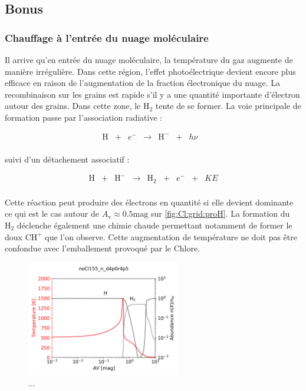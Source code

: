 
\subsection{Bonus}
\subsubsection{Chauffage à l'entrée du nuage moléculaire}

Il arrive qu'en entrée du nuage moléculaire, la température du gaz augmente de manière irrégulière. Dans cette région, l'effet photoélectrique devient encore plus efficace en raison de l'augmentation de la fraction électronique du nuage. La recombinaison sur les grains est rapide s'il y a une quantité importante d'électron autour des grains. Dans cette zone, le $\mathrm{H}_2$ tente de se former. La voie principale de formation passe par l'association radiative :

\begin{equation}
    \begin{array}{lccccclr}
       \mathrm{H}  & + & e^- & \rightarrow & \mathrm{H}^{-} & + & h\nu &  \\
    \end{array}
\end{equation}

suivi d'un détachement associatif :

\begin{equation}
    \begin{array}{lcccccclr}
       \mathrm{H}  & + &  \mathrm{H}^- & \rightarrow & \mathrm{H}_2 & + & e^- & + & KE\\
    \end{array}
\end{equation}

Cette réaction peut produire des électrons en quantité si elle devient dominante ce qui est le cas autour de $A_\mathrm{v} \approx 0.5 \mathrm{mag}$ sur \autoref{fig:Cl:grid:proH}. La formation du $\mathrm{H}_2$ déclenche également une chimie chaude permettant notamment de former le doux $\mathrm{CH}^+$ que l'on observe. Cette augmentation de température ne doit pas être confondue avec l'emballement provoqué par le Chlore.


\begin{figure}[!htbp]
    \centering
        \centering \includegraphics[trim = {0 0 0 1.5cm},clip,width=0.6\textwidth]{figure/Cl/grid/profil_H.png}
        \caption{...}
    \label{fig:Cl:grid:proH}
\end{figure}
